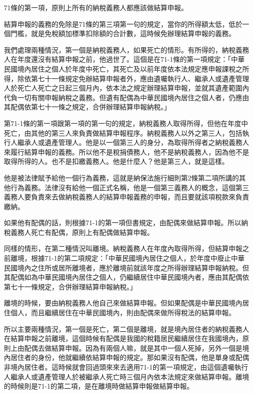\documentclass[]{ctexbook}
\begin{document}
71條的第一項，原則上所有的納稅義務人都應該做結算申報。

結算申報的義務的免除是71條的第三項第一句的規定，當你的所得額太低，低於一個門檻，就是免稅額加標準扣除額的合計數，這時候免辦理結算申報的義務。

我們處理兩種情況，第一個是納稅義務人，如果死亡的情形。有所得的，納稅義務人在年度還沒有結算申報之前，他過世了。這個是在71-1條的第一項規定：「中華民國境內居住之個人於年度中死亡，其死亡及以前年度依本法規定應申報課稅之所得，除依第七十一條規定免辦結算申報者外，應由遺囑執行人、繼承人或遺產管理人於死亡人死亡之日起三個月內，依本法之規定辦理結算申報，並就其遺產範圍內代負一切有關申報納稅之義務。但遺有配偶為中華民國境內居住之個人者，仍應由其配偶依第七十一條之規定，合併辦理結算申報納稅。」

第71-1條的第一項跟第一項的第一句的規定，納稅義務人取得所得，但他在年度中死亡，由其他的第三人來負責做結算申報程序。納稅義務人以外之第三人，包括執行人繼承人或遺產管理人。他是以一個第三人的身分，為取得所得者之納稅義務人來履行結算申報的義務。所以他不是稅捐債務人，他不是納稅義務人，因為他不是取得所得的人。也不是扣繳義務人。他是什麼人？他是第三人，就是這樣。

他是被法律賦予給他一個行為義務，這就是納保法施行細則第2條第二項所講的其他行為義務。法律沒有給他一個正式名稱，他是一個第三義務人的概念，這個第三義務人要負責來去做納稅義務人的結算申報義務的申報，而且要就該項稅款來負責繳納。

如果他有配偶的話，則根據71-1的第一項但書規定，由配偶來做結算申報。所以納稅義務人死亡有配偶，原則上有配偶做結算申報。

同樣的情形，在第二種情況叫離境。納稅義務人在年度內取得所得，但結算申報之前離境，根據71-1的第二項規定：「中華民國境內居住之個人，於年度中廢止中華民國境內之住所或居所離境者，應於離境前就該年度之所得辦理結算申報納稅。但其配偶如為中華民國境內居住之個人，仍繼續居住中華民國境內者，應由其配偶依第七十一條規定，合併辦理結算申報納稅。」

離境的時候，要由納稅義務人他自己來做結算申報。但如果配偶是中華民國境內居住個人，而且繼續居住在中華民國境內，則由配偶來做所得稅法的結算申報。

所以主要兩種情況，第一個是死亡，第二個是離境，就是境內居住者的納稅義務人在結算申報之前離境，這個時候有配偶是我國的稅籍居民繼續居住在我國境內，原則上由配偶去做結算申報。因為有兩個人嘛，就是其中一個人死掉，另外一個是境內居住者的身份，他就繼續依結算申報的規定。那如果沒有配偶，他是單身或配偶非境內居住者。這時候就會回過頭來來去適用71-1的第一項規定，由這個遺囑執行人繼承人或遺產管理人於被繼承人死亡時三個月內依本法規定來做結算申報。離境的時候則是71-1的第二項，是在離境時做結算申報做結算申報。
\end{document}
